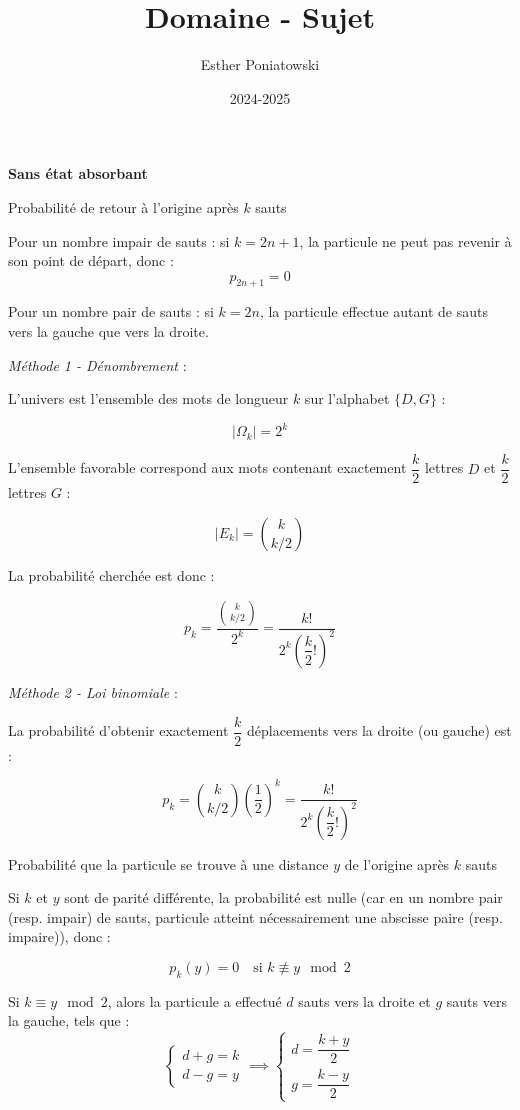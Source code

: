 \documentclass[10pt,a4paper]{article}
\title{Domaine - Sujet}
\author{Esther Poniatowski}
\date{2024-2025}
\begin{document}
\textbf{Sans état absorbant}

\q Probabilité de retour à l'origine après \( k \) sauts

Pour un nombre impair de sauts : si \( k = 2n + 1 \), la particule ne peut pas revenir à son point
de départ, donc :
\[
\boxed{p_{2n+1} = 0}
\]

Pour un nombre pair de sauts : si \( k = 2n \), la particule effectue autant de sauts vers la gauche que vers la droite.

\medskip

\emph{Méthode 1 - Dénombrement} :

L'univers est l'ensemble des mots de longueur \( k \) sur l'alphabet \( \{D, G\} \) :

\[
|\Omega_k| = 2^k
\]

L'ensemble favorable correspond aux mots contenant exactement \( \dfrac{k}{2} \) lettres \( D \) et \(
\dfrac{k}{2} \) lettres \( G \) :

\[
|E_k| = \binom{k}{k/2}
\]

La probabilité cherchée est donc :

\[
\boxed{p_k = \dfrac{\binom{k}{k/2}}{2^k} = \dfrac{k!}{2^k \left( \dfrac{k}{2}! \right)^2}}
\]

\medskip

\emph{Méthode 2 - Loi binomiale} :

La probabilité d'obtenir exactement \( \dfrac{k}{2} \) déplacements vers la droite (ou gauche) est :

\[
p_k = \binom{k}{k/2} \left( \dfrac{1}{2} \right)^k = \dfrac{k!}{2^k \left( \dfrac{k}{2}! \right)^2}
\]

\q Probabilité que la particule se trouve à une distance \( y \) de l'origine après \( k \) sauts

Si \( k \) et \( y \) sont de parité différente, la probabilité est nulle (car en un nombre pair
(resp. impair) de sauts, particule atteint nécessairement une abscisse paire (resp. impaire)), donc
:

\[
\boxed{p_k(y) = 0 \quad \text{si } k \not\equiv y \mod 2}
\]

Si \( k \equiv y \mod 2 \), alors la particule a effectué $d$ sauts vers la droite et $g$ sauts vers
la gauche, tels que :
\[
\begin{cases}
d + g = k\\
d - g = y
\end{cases} \implies
\begin{cases}
d = \dfrac{k + y}{2} \\
g = \dfrac{k - y}{2}
\end{cases}
\]
\end{document}
